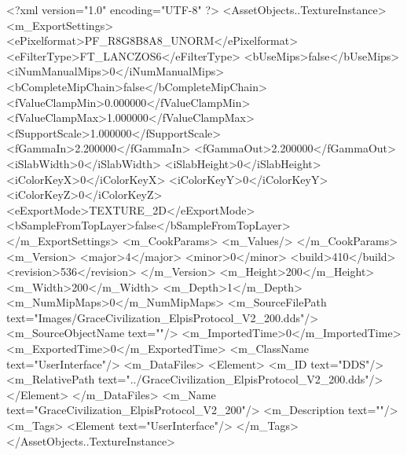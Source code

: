 <?xml version="1.0" encoding="UTF-8" ?>
<AssetObjects..TextureInstance>
	<m_ExportSettings>
		<ePixelformat>PF_R8G8B8A8_UNORM</ePixelformat>
		<eFilterType>FT_LANCZOS6</eFilterType>
		<bUseMips>false</bUseMips>
		<iNumManualMips>0</iNumManualMips>
		<bCompleteMipChain>false</bCompleteMipChain>
		<fValueClampMin>0.000000</fValueClampMin>
		<fValueClampMax>1.000000</fValueClampMax>
		<fSupportScale>1.000000</fSupportScale>
		<fGammaIn>2.200000</fGammaIn>
		<fGammaOut>2.200000</fGammaOut>
		<iSlabWidth>0</iSlabWidth>
		<iSlabHeight>0</iSlabHeight>
		<iColorKeyX>0</iColorKeyX>
		<iColorKeyY>0</iColorKeyY>
		<iColorKeyZ>0</iColorKeyZ>
		<eExportMode>TEXTURE_2D</eExportMode>
		<bSampleFromTopLayer>false</bSampleFromTopLayer>
	</m_ExportSettings>
	<m_CookParams>
		<m_Values/>
	</m_CookParams>
	<m_Version>
		<major>4</major>
		<minor>0</minor>
		<build>410</build>
		<revision>536</revision>
	</m_Version>
	<m_Height>200</m_Height>
	<m_Width>200</m_Width>
	<m_Depth>1</m_Depth>
	<m_NumMipMaps>0</m_NumMipMaps>
	<m_SourceFilePath text="Images/GraceCivilization_ElpisProtocol_V2_200.dds"/>
	<m_SourceObjectName text=""/>
	<m_ImportedTime>0</m_ImportedTime>
	<m_ExportedTime>0</m_ExportedTime>
	<m_ClassName text="UserInterface"/>
	<m_DataFiles>
		<Element>
			<m_ID text="DDS"/>
			<m_RelativePath text="../GraceCivilization_ElpisProtocol_V2_200.dds"/>
		</Element>
	</m_DataFiles>
	<m_Name text="GraceCivilization_ElpisProtocol_V2_200"/>
	<m_Description text=""/>
	<m_Tags>
		<Element text="UserInterface"/>
	</m_Tags>
</AssetObjects..TextureInstance>
